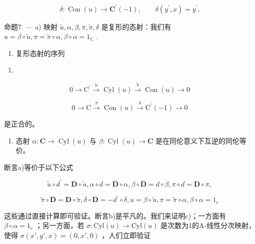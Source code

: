 \[
\delta : \operatorname{Con} (u) \to \mathbf {C} ^ {\prime} (- 1), \qquad \delta (y ^ {\prime}, x) = y ^ {\prime}.
\]

命题7. --- a) 映射 \(\tilde{u}, \alpha, \beta, \pi, \tilde{\pi}, \delta\) 是复形的态射：我们有 \(u = \beta \circ \tilde{u}, \pi = \tilde{\pi} \circ \alpha, \beta \circ \alpha = 1_{\mathbb{C}}\) .

\begin{enumerate}
\def\labelenumi{\alph{enumi})}
\setcounter{enumi}{1}
\tightlist
\item
  复形态射的序列
\end{enumerate}

\begin{enumerate}
\def\labelenumi{(\arabic{enumi})}
\setcounter{enumi}{5}
\tightlist
\item
\end{enumerate}

\[
0 \rightarrow \mathrm{C} ^ {\prime} \stackrel {\tilde {u}} {\rightarrow} \operatorname{Cyl} (u) \stackrel {\tilde {\pi}} {\rightarrow} \operatorname{Con} (u) \rightarrow 0\tag{7}
\]

\[
0 \rightarrow \mathrm{C} \xrightarrow {\pi} \operatorname{Con} (u) \xrightarrow {\delta} \mathrm{C} ^ {\prime} (- 1) \rightarrow 0
\]

是正合的。

\begin{enumerate}
\def\labelenumi{\alph{enumi})}
\setcounter{enumi}{2}
\tightlist
\item
  态射 \(\alpha : \mathbf{C} \to \operatorname{Cyl}(u)\) 与 \(\beta : \operatorname{Cyl}(u) \to \mathbf{C}\) 是在同伦意义下互逆的同伦等价。
\end{enumerate}

断言a)等价于以下公式

\[
\tilde {u} \circ d ^ {\prime} = \overline {{\mathbf {D}}} \circ \tilde {u}, \alpha \circ d = \overline {{\mathbf {D}}} \circ \alpha , \beta \circ \overline {{\mathbf {D}}} = d \circ \beta , \pi \circ d = \mathbf {D} \circ \pi ,
\]

\[
\tilde {\pi} \circ \overline {{\mathbf {D}}} = \mathbf {D} \circ \tilde {\pi}, \delta \circ \mathbf {D} = - d ^ {\prime} \circ \delta , u = \beta \circ \tilde {u}, \pi = \tilde {\pi} \circ \alpha , \beta \circ \alpha = 1 _ {\mathrm{c}}
\]

这些通过直接计算即可验证。断言b)是平凡的。我们来证明c)；一方面有 \(\beta \circ \alpha = 1_{c}\) ；另一方面，若 \(\sigma: \text{Cyl}(u) \to \text{Cyl}(u)\) 是次数为1的A-线性分次映射，使得 \(\sigma(x', y', x) = (0, x', 0)\) ，人们立即验证

